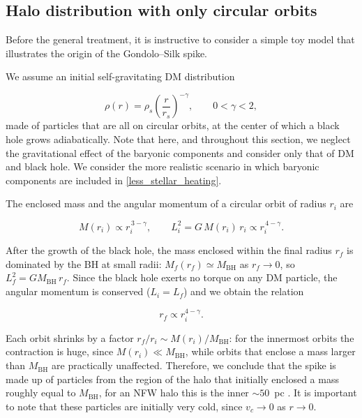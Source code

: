 \subsection{Halo distribution with only circular orbits} \label{toymodel}

Before the general treatment, it is instructive to consider a simple toy model that illustrates the origin of the Gondolo--Silk spike.

We assume an initial self-gravitating DM distribution

\begin{equation} \label{eq:powerlaw}
\rho(r) = \rho_s \left( \frac{r}{r_s} \right)^{-\gamma},
\qquad 0<\gamma<2,
\end{equation}
made of particles that are all on circular orbits, at the center
of which a black hole grows adiabatically.
Note that here, and throughout this section, we neglect the gravitational effect of the baryonic components and 
consider only that of DM and black hole. 
We consider the more realistic scenario in which baryonic components are included in \cref{less_stellar_heating}.

The enclosed mass and 
the angular momentum of a circular orbit of radius 
$r_i$ are

\begin{equation}
M(r_i) \propto r_i^{\,3-\gamma}, \qquad L_i^{2} = G\, M(r_i)\, r_i \propto r_i^{\,4-\gamma}.
\end{equation}

After the growth of the black hole, the mass enclosed within the final radius $r_f$ is dominated by the BH at small radii: $M_f(r_f) \simeq M_{\mathrm{BH}}$ as $r_f \to 0$, 
so $L_f^{2} = G M_{\mathrm{BH}}\, r_f$.
Since the black hole exerts no torque on any DM
particle, the angular momentum is conserved ($L_i = L_f$) and we obtain the relation

\begin{equation} \label{eq:toymap}
r_f \propto r_i^{4-\gamma}.
\end{equation}

Each orbit shrinks by a factor $r_f/r_i \sim M(r_i)/M_{\mathrm{BH}}$: 
for the innermost orbits the contraction is huge, since $M(r_i) \ll M_{\mathrm{BH}}$,
while orbits that enclose a mass larger than $M_{\mathrm{BH}}$ are practically unaffected. 
Therefore, we conclude that the spike is made up of particles from the region of the halo
that initially enclosed a mass roughly equal to $M_{\mathrm{BH}}$, for an NFW halo this is the inner $\sim 50$~pc \cite{Ullio_2001}.
It is important to note that these particles are initially very cold, since $v_c \to 0$ as
$r \to 0$.

